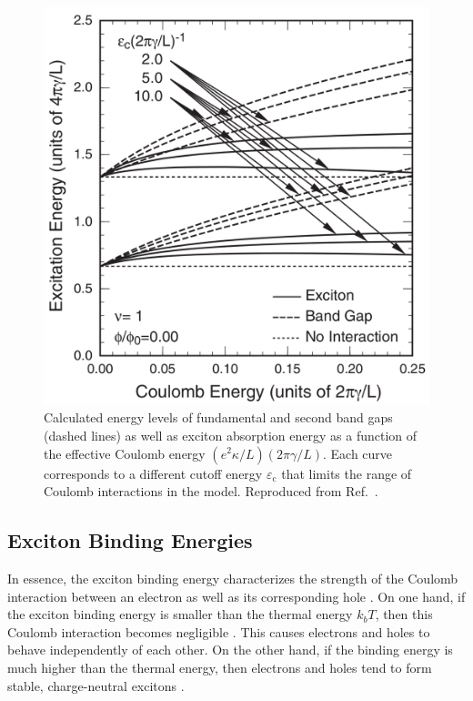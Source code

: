 \begin{figure}[ht]
	\centering
	\includegraphics[scale=0.25]{images/chapter_optical_props/coulomb_shift_ando}
	\caption{Calculated energy levels of fundamental and second band gaps (dashed lines) as well as exciton absorption energy as a function of the effective Coulomb energy $(e^2 \kappa / L) (2 \pi \gamma / L)$. Each curve corresponds to a different cutoff energy $\varepsilon_\text{c}$ that limits the range of Coulomb interactions in the model. Reproduced from Ref.\ \cite{ando2005theory}.}
	\label{fig:coulomb_shift}
\end{figure}



\subsection{Exciton Binding Energies}

In essence, the exciton binding energy characterizes the strength of the Coulomb interaction between an electron as well as its corresponding hole \cite{valkunas2006exciton}. On one hand, if the exciton binding energy is smaller than the thermal energy $k_b T$, then this Coulomb interaction becomes negligible \cite{valkunas2006exciton}. This causes electrons and holes to behave independently of each other. On the other hand, if the binding energy is much higher than the thermal energy, then electrons and holes tend to form stable, charge-neutral excitons \cite{valkunas2006exciton}.

